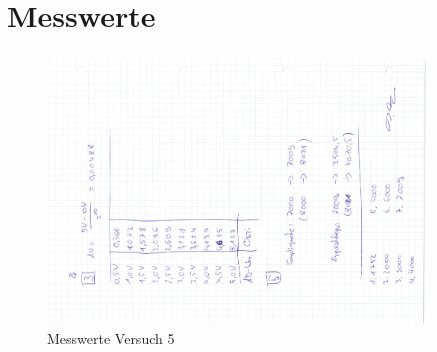 \documentclass[12pt, oneside, a4paper, \docLanguage]{report}
\begin{document}
\section{Messwerte}
\label{chap:VERSUCH_5_MESSWERTE}
\begin{figure}[H]
	\centering
	\includegraphics[angle=270,width=0.9\textwidth]{../Messdaten3.pdf}
	\caption{Messwerte Versuch 5}
\end{figure}
\end{document}
